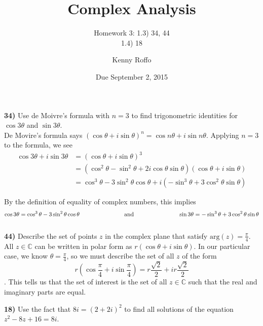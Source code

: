 \documentclass{scrartcl}
\title{Complex Analysis}
\subtitle{Homework 3: 1.3) 34, 44 \\ 1.4) 18}
\author{Kenny Roffo}
\date{Due September 2, 2015}
\begin{document}
\maketitle

\textbf{34)} Use de Moivre's formula with $n=3$ to find trigonometric identities for $\cos{3\theta}$ and $\sin{3\theta}$.\\

De Movire's formula says $\left(\cos{\theta} + i\sin{\theta}\right)^n = \cos{n\theta} + i\sin{n\theta}$. Applying $n=3$ to the formula, we see
\begin{align*}
  \cos{3\theta} + i\sin{3\theta} &= \left(\cos{\theta} + i\sin{\theta}\right)^3\\
  &= \left(\cos^2{\theta}-\sin^2{\theta}+2i\cos{\theta}\sin{\theta}\right)\left(\cos{\theta}+i\sin{\theta}\right)\\
  &= \cos^3{\theta} - 3\sin^2{\theta}\cos{\theta} + i\left(-\sin^3{\theta} + 3\cos^2{\theta}\sin{\theta}\right)
\end{align*}

By the definition of equality of complex numbers, this implies
$$ \cos{3\theta} = \cos^3{\theta} - 3\sin^2{\theta}\cos{\theta} \text{\hspace{1in} and \hspace{1in}} \sin{3\theta} = -\sin^3{\theta} + 3\cos^2{\theta}\sin{\theta} $$\\

\textbf{44)} Describe the set of points $z$ in the complex plane that satisfy $\text{arg}(z)=\frac{\pi}{4}$.\\

All $z \in \mathbb{C}$ can be written in polar form as $r\left(\cos{\theta} + i\sin{\theta}\right)$. In our particular case, we know $\theta = \frac{\pi}{4}$, so we must describe the set of all $z$ of the form $$r\left(\cos{\frac{\pi}{4}} + i\sin{\frac{\pi}{4}}\right) = r\frac{\sqrt{2}}{2} + ir\frac{\sqrt{2}}{2}$$. This tells us that the set of interest is the set of all $z \in \mathbb{C}$ such that the real and imaginary parts are equal.\pagebreak

\textbf{18)} Use the fact that $8i = (2 + 2i)^2$ to find all solutions of the equation $z^2 -8z + 16 = 8i$.\\
\end{document}
